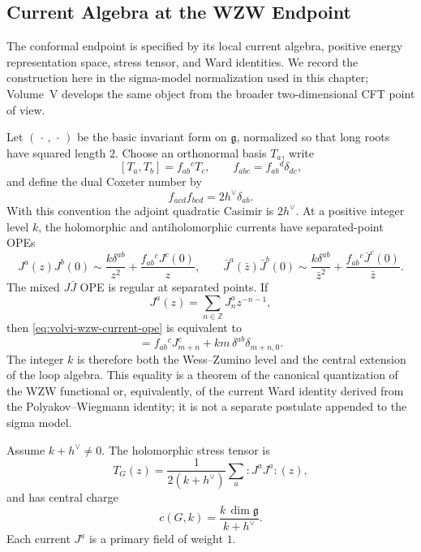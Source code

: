 \subsection{Current Algebra at the WZW Endpoint}
\label{subsec:volvi-wzw-endpoint-current-algebra}

The conformal endpoint is specified by its local current algebra, positive
energy representation space, stress tensor, and Ward identities.  We record
the construction here in the sigma-model normalization used in this chapter;
Volume~V develops the same object from the broader two-dimensional CFT point
of view.

Let \((\,\cdot\,,\,\cdot\,)\) be the basic invariant form on
\(\mathfrak g\), normalized so that long roots have squared length \(2\).
Choose an orthonormal basis \(T_a\), write
\[
  [T_a,T_b]=f_{ab}{}^cT_c,\qquad f_{abc}=f_{ab}{}^d\delta_{dc},
\]
and define the dual Coxeter number by
\begin{equation}
  f_{acd}f_{bcd}=2h^\vee\delta_{ab}.
  \label{eq:volvi-wzw-dual-coxeter-normalization}
\end{equation}
With this convention the adjoint quadratic Casimir is \(2h^\vee\).
At a positive integer level \(k\), the holomorphic and antiholomorphic
currents have separated-point OPEs
\begin{equation}
  J^a(z)J^b(0)
  \sim
  \frac{k\delta^{ab}}{z^2}
  +
  \frac{f_{ab}{}^cJ^c(0)}{z},
  \qquad
  \bar J^a(\bar z)\bar J^b(0)
  \sim
  \frac{k\delta^{ab}}{\bar z^2}
  +
  \frac{f_{ab}{}^c\bar J^c(0)}{\bar z}.
  \label{eq:volvi-wzw-current-ope}
\end{equation}
The mixed \(J\bar J\) OPE is regular at separated points.  If
\[
  J^a(z)=\sum_{n\in\mathbb Z}J_n^az^{-n-1},
\]
then \eqref{eq:volvi-wzw-current-ope} is equivalent to
\begin{equation}
  [J_m^a,J_n^b]
  =
  f_{ab}{}^cJ_{m+n}^c
  +
  km\,\delta^{ab}\delta_{m+n,0}.
  \label{eq:volvi-wzw-affine-mode-algebra}
\end{equation}
The integer \(k\) is therefore both the Wess--Zumino level and the central
extension of the loop algebra.  This equality is a theorem of the canonical
quantization of the WZW functional or, equivalently, of the current Ward
identity derived from the Polyakov--Wiegmann identity; it is not a separate
postulate appended to the sigma model.

\begin{lemma}
\label{lem:volvi-wzw-sugawara}
Assume \(k+h^\vee\ne0\).  The holomorphic stress tensor is
\begin{equation}
  T_G(z)
  =
  \frac{1}{2(k+h^\vee)}
  \sum_a :J^aJ^a:(z),
  \label{eq:volvi-wzw-sugawara-tensor}
\end{equation}
and has central charge
\begin{equation}
  c(G,k)=\frac{k\,\dim\mathfrak g}{k+h^\vee}.
  \label{eq:volvi-wzw-central-charge}
\end{equation}
Each current \(J^a\) is a primary field of weight \(1\).
\end{lemma}

